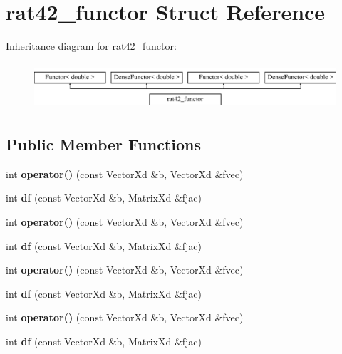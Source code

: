 \hypertarget{structrat42__functor}{}\section{rat42\+\_\+functor Struct Reference}
\label{structrat42__functor}
Inheritance diagram for rat42\+\_\+functor\+:\begin{figure}[H]
\begin{center}
\leavevmode
\includegraphics[height=1.728395cm]{structrat42__functor}
\end{center}
\end{figure}
\subsection*{Public Member Functions}
\begin{DoxyCompactItemize}
\item 
\mbox{\label{structrat42__functor_aedb7b1d0fd2afa392c0b55c20fc3aba6}} 
int {\bfseries operator()} (const Vector\+Xd \&b, Vector\+Xd \&fvec)
\item 
\mbox{\label{structrat42__functor_aa2a49cea6542bc13662e69163f017f92}} 
int {\bfseries df} (const Vector\+Xd \&b, Matrix\+Xd \&fjac)
\item 
\mbox{\label{structrat42__functor_aedb7b1d0fd2afa392c0b55c20fc3aba6}} 
int {\bfseries operator()} (const Vector\+Xd \&b, Vector\+Xd \&fvec)
\item 
\mbox{\label{structrat42__functor_aa2a49cea6542bc13662e69163f017f92}} 
int {\bfseries df} (const Vector\+Xd \&b, Matrix\+Xd \&fjac)
\item 
\mbox{\label{structrat42__functor_aedb7b1d0fd2afa392c0b55c20fc3aba6}} 
int {\bfseries operator()} (const Vector\+Xd \&b, Vector\+Xd \&fvec)
\item 
\mbox{\label{structrat42__functor_aa2a49cea6542bc13662e69163f017f92}} 
int {\bfseries df} (const Vector\+Xd \&b, Matrix\+Xd \&fjac)
\item 
\mbox{\label{structrat42__functor_aedb7b1d0fd2afa392c0b55c20fc3aba6}} 
int {\bfseries operator()} (const Vector\+Xd \&b, Vector\+Xd \&fvec)
\item 
\mbox{\label{structrat42__functor_aa2a49cea6542bc13662e69163f017f92}} 
int {\bfseries df} (const Vector\+Xd \&b, Matrix\+Xd \&fjac)
\end{DoxyCompactItemize}
